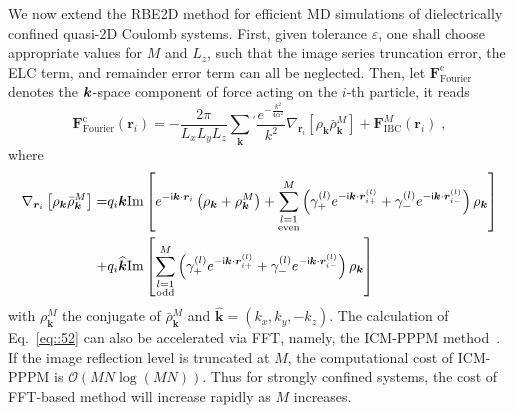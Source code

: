 We now extend the RBE2D method for efficient MD simulations of dielectrically confined quasi-2D Coulomb systems. 
First, given tolerance $\varepsilon$, one shall choose appropriate values for $M$ and $L_z$, such that the image series truncation error, the ELC term, and remainder error term can all be neglected. Then, let $\bm{F}_{\text{Fourier}}^{\text{c}}$ denotes the $\boldsymbol{k}$-space component of force acting on the $i$-th particle, it reads
\begin{equation}\label{eq::52}
\bm{F}_{\text{Fourier}}^{\text{c}}(\bm{r}_i)=-\frac{2\pi}{L_xL_yL_z}\sum_{\bm{k}}{}^{\prime}\frac{e^{-\frac{k^2}{4\alpha^2}}}{k^2}\nabla_{\bm{r}_i}\left[\rho_{\bm{k}}\bar{\rho}_{\bm{k}}^{M}\right]+\bm{F}_{\text{IBC}}^{M}(\bm{r}_i)\;,%
\end{equation}
where 
\begin{equation}\label{eq::rhorhoM}
\begin{split}
\nabla_{\bm{r}_i}\left[\rho_{\bm{k}}\bar{\rho}_{\bm{k}}^{M}\right]=&q_i\bm{k}\text{Im}\left[e^{-\mathsf i\bm{k}\cdot\bm{r}_i}\left(\rho_{\bm{k}}+\rho_{\bm{k}}^{M}\right)+\sum_{\substack{l=1\\ \text{even}}}^{M}\left(\gamma_{+}^{(l)}e^{-\mathsf i\bm{k}\cdot\bm{r}_{i+}^{(l)}}+\gamma_{-}^{(l)}e^{-\mathsf i\bm{k}\cdot\bm{r}_{i-}^{(l)}}\right)\rho_{\bm{k}}\right]\\
+&q_i\widehat{\bm{k}}\text{Im}\left[\sum_{\substack{l=1\\ \text{odd}}}^{M}\left(\gamma_{+}^{(l)}e^{-\mathsf i\bm{k}\cdot\bm{r}_{i+}^{(l)}}+\gamma_{-}^{(l)}e^{-\mathsf i\bm{k}\cdot\bm{r}_{i-}^{(l)}}\right)\rho_{\bm{k}}\right]
\end{split}
\end{equation}
with $\rho_{\bm{k}}^{M}$ the conjugate of $\bar{\rho}_{\bm{k}}^{M}$ and $\widehat{\bm{k}}=(k_x,k_y,-k_z)$. The calculation of Eq.~\eqref{eq::52} can also be accelerated via FFT, namely, the ICM-PPPM method~\cite{yuan2021particle}. 
If the image reflection level is truncated at $M$, the computational cost of ICM-PPPM is $\mathcal O(MN \log(MN))$. Thus for strongly confined systems, the cost of FFT-based method will increase rapidly as $M$ increases.

